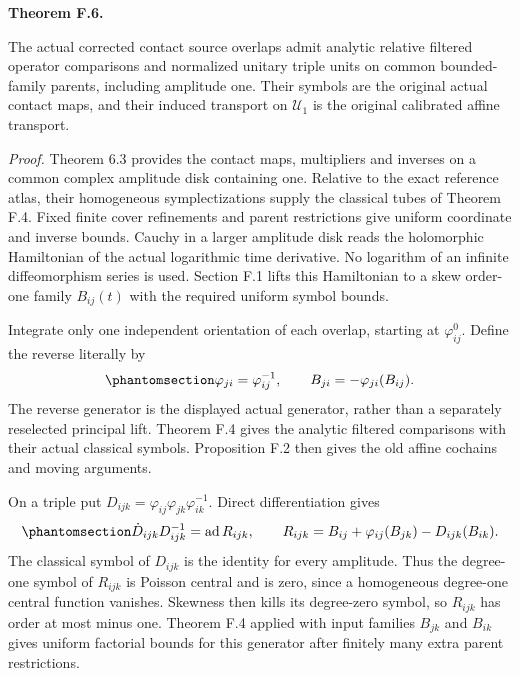 \documentclass[
  english,
  11pt,
  reqno]{amsart}
\makeatletter
\newcommand{\pandocstatementheading}[1]{%
  \par\addpenalty{\@beginparpenalty}%
  \addvspace{.5\baselineskip plus .2\baselineskip minus .2\baselineskip}%
  {\normalfont\bfseries #1\par}%
  \nobreak\@afterindenttrue\@afterheading
}
\makeatother
\begin{document}
\pandocstatementheading{\protect{}\label{thm:gg-op-analytic-source-descent}Theorem F.6.}

The actual corrected contact source overlaps admit analytic relative
filtered operator comparisons and normalized unitary triple units on
common bounded-family parents, including amplitude one. Their symbols
are the original actual contact maps, and their induced transport on
\(\mathscr U_1\) is the original calibrated affine transport.

\emph{Proof.} Theorem 6.3 provides the contact maps, multipliers and
inverses on a common complex amplitude disk containing one. Relative to
the exact reference atlas, their homogeneous symplectizations supply the
classical tubes of Theorem F.4. Fixed finite cover refinements and
parent restrictions give uniform coordinate and inverse bounds. Cauchy
in a larger amplitude disk reads the holomorphic Hamiltonian of the
actual logarithmic time derivative. No logarithm of an infinite
diffeomorphism series is used. Section F.1 lifts this Hamiltonian to a
skew order-one family \(B_{ij}(t)\) with the required uniform symbol
bounds.

Integrate only one independent orientation of each overlap, starting at
\(\varphi^0_{ij}\). Define the reverse literally by
\begin{equation}\protect\phantomsection\label{eq:gg-op-analytic-inverse-generator}{
 \varphi_{ji}=\varphi_{ij}^{-1},\qquad
 B_{ji}=-\varphi_{ji}(B_{ij}).
}\end{equation} The reverse generator is the displayed actual generator,
rather than a separately reselected principal lift. Theorem F.4 gives
the analytic filtered comparisons with their actual classical symbols.
Proposition F.2 then gives the old affine cochains and moving arguments.

On a triple put \(D_{ijk}=\varphi_{ij}\varphi_{jk}\varphi_{ik}^{-1}\).
Direct differentiation gives
\begin{equation}\protect\phantomsection\label{eq:gg-op-analytic-triple-generator}{
 \dot D_{ijk}D_{ijk}^{-1}=\operatorname{ad}R_{ijk},\qquad
 R_{ijk}=B_{ij}+\varphi_{ij}(B_{jk})-D_{ijk}(B_{ik}).
}\end{equation} The classical symbol of \(D_{ijk}\) is the identity for
every amplitude. Thus the degree-one symbol of \(R_{ijk}\) is Poisson
central and is zero, since a homogeneous degree-one central function
vanishes. Skewness then kills its degree-zero symbol, so \(R_{ijk}\) has
order at most minus one. Theorem F.4 applied with input families
\(B_{jk}\) and \(B_{ik}\) gives uniform factorial bounds for this
generator after finitely many extra parent restrictions.
\end{document}
